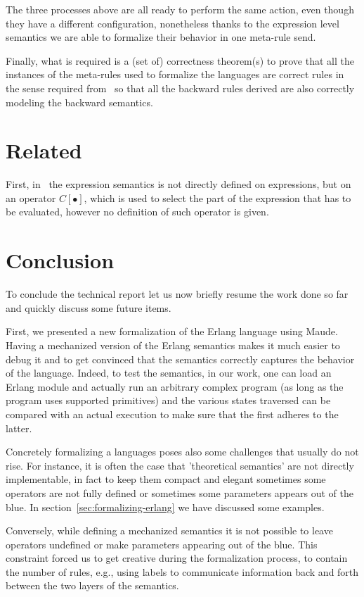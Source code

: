\documentclass{article}[12pt,a4paper]
\theoremstyle{definition}
\begin{document}
The three processes above are all ready to perform the same action, even though
they have a different configuration, nonetheless thanks to the expression level
semantics we are able to formalize their behavior in one meta-rule send.

Finally, what is required is a (set of) correctness theorem(s) to prove that all
the instances of the meta-rules used to formalize the languages are correct
rules in the sense required from~\cite{LaneseM20} so that all the backward rules
derived are also correctly modeling the backward semantics.


\section{Related}\label{sec:related}
First, in~\cite{Gonzalez-AbrilV21} the expression semantics is not directly
defined on expressions, but on an
operator $C[\bullet]$, which is used to select the part of the expression that has to be
evaluated, however no definition of such operator is given.

\section{Conclusion}\label{sec:conclusion}
To conclude the technical report let us now briefly resume the work done so far
and quickly discuss some future items.

First, we presented a new formalization of the Erlang language using Maude.
Having a mechanized version of the Erlang semantics makes it much easier to
debug it and to get convinced that the semantics correctly captures the
behavior of the language. Indeed, to test the semantics, in our work, one can
load an Erlang module and actually run an arbitrary complex program (as long as
the program uses supported primitives) and the various states traversed can be
compared with an actual execution to make sure that the first adheres to the
latter.

Concretely formalizing a languages poses also some challenges that
usually do not rise. For instance, it is often the case that 'theoretical
semantics' are not directly implementable, in fact to keep them compact and
elegant sometimes some operators are not fully defined or sometimes some
parameters appears out of the blue. In section~\ref{sec:formalizing-erlang} we
have discussed some examples.

Conversely, while defining a mechanized semantics it is not possible to leave
operators undefined or make parameters appearing out of the blue. This
constraint forced us to get creative during the formalization process, to
contain the number of rules, e.g., using labels to communicate information back
and forth between the two layers of the semantics.
\end{document}
